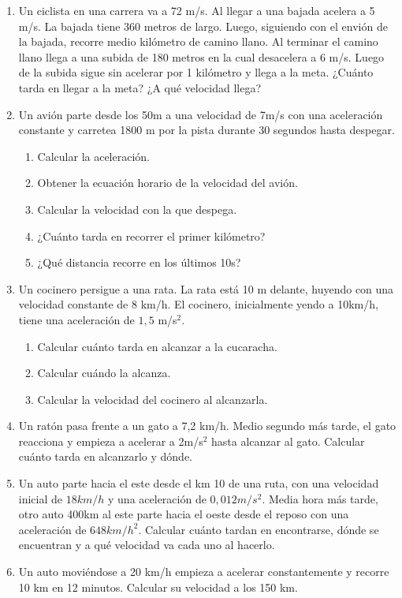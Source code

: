 \begin{enumerate}
\item Un ciclista en una carrera va a 72 m/s. Al llegar a una bajada acelera a 5 m/s. La bajada tiene 360 metros de largo. Luego, siguiendo con el envión de la bajada, recorre medio kilómetro de camino llano. Al terminar el camino llano llega a una subida de 180 metros en la cual desacelera a 6 m/s. Luego de la subida sigue sin acelerar por 1 kilómetro y llega a la meta. ¿Cuánto tarda en llegar a la meta? ¿A qué velocidad llega?

\item Un avión parte desde los 50m a una velocidad de 7m/s con una aceleración constante y carretea 1800 m por la pista durante 30 segundos hasta despegar.

\begin{enumerate}
\item Calcular la aceleración. %
\item Obtener la ecuación horario de la velocidad del avión.
\item Calcular la velocidad con la que despega. %
\item ¿Cuánto tarda en recorrer el primer kilómetro? %
\item ¿Qué distancia recorre en los últimos 10s?
\end{enumerate}

\item Un cocinero persigue a una rata. La rata está 10 m delante, huyendo con una velocidad constante de 8 km/h. El cocinero, inicialmente yendo a 10km/h, tiene una aceleración de $1,5$ m/s$^2$.
\begin{enumerate}
    \item Calcular cuánto tarda en alcanzar a la cucaracha.
    \item Calcular cuándo la alcanza.
    \item Calcular la velocidad del cocinero al alcanzarla.
\end{enumerate}

\item Un ratón pasa frente a un gato a 7,2 km/h. Medio segundo más tarde, el gato reacciona y empieza a acelerar a 2m/s$^2$ hasta alcanzar al gato. Calcular cuánto tarda en alcanzarlo y dónde.


\item Un auto parte hacia el este desde el km 10 de una ruta, con una velocidad inicial de $18 km/h$ y una aceleración de $0,012 m/s^2$. Media hora más tarde, otro auto 400km al este parte hacia el oeste desde el reposo con una aceleración de $648 km/h^2$. Calcular cuánto tardan en encontrarse, dónde se encuentran y a qué velocidad va cada uno al hacerlo.


\item Un auto moviéndose a 20 km/h empieza a acelerar constantemente y recorre 10 km en 12 minutos. Calcular su velocidad a los 150 km.
\end{enumerate}


